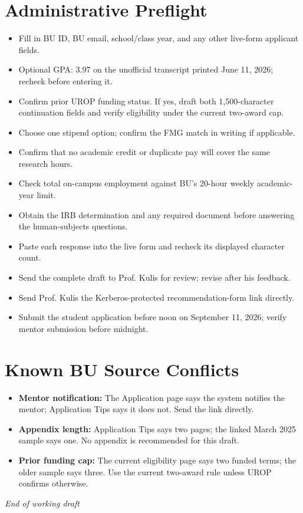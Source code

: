 \documentclass[11pt,letterpaper]{article}
\newcommand{\checkbox}{\(\square\)}
\begin{document}
\section*{Administrative Preflight}

\begin{itemize}[label=\checkbox]
  \item Fill in BU ID, BU email, school/class year, and any other live-form applicant fields.
  \item Optional GPA: 3.97 on the unofficial transcript printed June 11, 2026; recheck before entering it.
  \item Confirm prior UROP funding status. If yes, draft both 1,500-character continuation fields and verify eligibility under the current two-award cap.
  \item Choose one stipend option; confirm the FMG match in writing if applicable.
  \item Confirm that no academic credit or duplicate pay will cover the same research hours.
  \item Check total on-campus employment against BU's 20-hour weekly academic-year limit.
  \item Obtain the IRB determination and any required document before answering the human-subjects questions.
  \item Paste each response into the live form and recheck its displayed character count.
  \item Send the complete draft to Prof. Kulis for review; revise after his feedback.
  \item Send Prof. Kulis the Kerberos-protected recommendation-form link directly.
  \item Submit the student application before noon on September 11, 2026; verify mentor submission before midnight.
\end{itemize}

\section*{Known BU Source Conflicts}

\begin{itemize}
  \item \textbf{Mentor notification:} The Application page says the system notifies the mentor; Application Tips says it does not. Send the link directly.
  \item \textbf{Appendix length:} Application Tips says two pages; the linked March 2025 sample says one. No appendix is recommended for this draft.
  \item \textbf{Prior funding cap:} The current eligibility page says two funded terms; the older sample says three. Use the current two-award rule unless UROP confirms otherwise.
\end{itemize}

\begin{center}
  \vspace{7pt}
  {\color{Muted}\itshape\small End of working draft}
\end{center}
\end{document}
